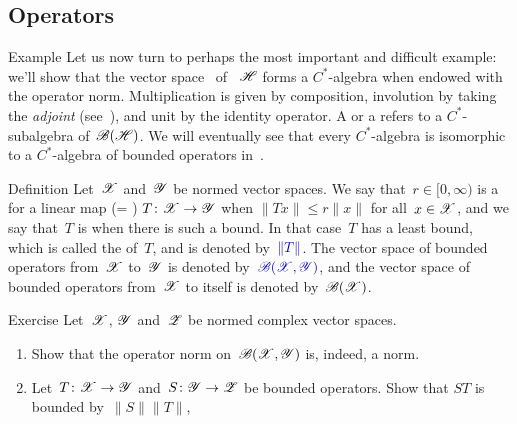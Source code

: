\documentclass[a]{subfiles}
\begin{document}
\subsection{Operators}
\begin{parsec}[hilb]%
\begin{point}{Example}%
Let us now turn to perhaps the most important
and difficult example:
we'll show that the vector space~\Define{$\scrB(\scrH)$}%
of ~$\mathscr{H}$ forms a $C^*$-algebra
when endowed with the operator 
norm.
Multiplication is given by composition,
involution by taking the \emph{adjoint} (see~),
and unit by the identity operator.
A %
or
a %
refers to a $C^*$-subalgebra of~$\scrB(\scrH)$.
We will eventually see that every $C^*$-algebra is isomorphic to a $C^*$-algebra
of bounded operators in~.
\end{point}
\begin{point}{Definition}%
Let~$\mathscr{X}$ and~$\mathscr{Y}$ be normed
vector spaces.
We say that~$r\in [0,\infty)$
is a %
for a linear map (=%
) 
$T\colon \mathscr{X}\to\mathscr{Y}$
when  $\|Tx\|\leq r\|x\|$ for all~$x\in \mathscr{X}$,
and we say that~$T$ is %
when there is such a bound.
In that case~$T$ has a least bound,
which is called the %
%
 of~$T$,
and is denoted by~$\Define{\|T\|}$.
The vector space of bounded operators
from~$\mathscr{X}$ to~$\mathscr{Y}$
is denoted by~$\Define{\scrB(\scrX,\scrY)}$,%
and the vector space of bounded operators
from~$\mathscr{X}$ to itself is denoted by~$\mathscr{B}(\mathscr{X})$.%
\end{point}
\begin{point}{Exercise}%
Let~$\mathscr{X}$, $\mathscr{Y}$ and~$\mathscr{Z}$ be normed complex vector spaces.
\begin{enumerate}
\item
Show that the operator norm on~$\mathscr{B}(\mathscr{X},\mathscr{Y})$
is, indeed, a norm.
\item
Let~$T\colon \mathscr{X}\to \mathscr{Y}$ and~$S\colon \mathscr{Y}\to\mathscr{Z}$
be bounded operators.
Show that $ST$ is bounded by~$\|S\|\|T\|$,

\end{enumerate}
\end{point}
\end{parsec}
\end{document}
